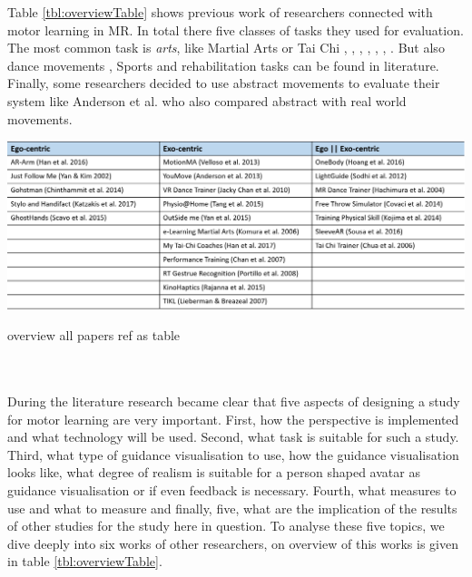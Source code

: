 Table \ref{tbl:overviewTable} shows previous work of researchers connected with motor learning in MR. In total there five classes of tasks they used for evaluation. The most common task is \textit{arts}, like Martial Arts or Tai Chi \cite{Han2016}, \cite{Yan2002}, \cite{Katzakis2017}, \cite{Han2017}, \cite{Portillo2008}, \cite{Hoang2016}, \cite{Chua2003} \cite{Komura2006}. But also dance movements \cite{Anderson2013a}\cite{Yan2015}\cite{Chan2007}\cite{Hachimura2004}, Sports \cite{Covaci2014}\cite{Kojima2014} and rehabilitation tasks \cite{Velloso2013}\cite{Chinthammit2014}\cite{Tang2015}\cite{Rajanna2015}\cite{Sousa2016} can be found in literature. Finally, some researchers decided to use abstract movements \cite{Sodhi2012}\cite{Lieberman2007} to evaluate their system like Anderson et al. \cite{Anderson2013a} who also compared abstract with real world movements.
\begin{table}
	\centering
	\includegraphics[width=1.0\textwidth]{img/overview_table.png}
	\caption{overview all papers \todo ref as table}
	\label{tbl:overviewTable}
\end{table}\\ $ $\\
During the literature research became clear that five aspects of designing a study for motor learning are very important. First, how the perspective is implemented and what technology will be used. Second, what task is suitable for such a study. Third, what type of guidance visualisation to use, how the guidance visualisation looks like, what degree of realism is suitable for a person shaped avatar as guidance visualisation or if even feedback is necessary. Fourth, what measures to use and what to measure and finally, five, what are the implication of the results of other studies for the study here in question. To analyse these five topics, we dive deeply into six works of other researchers, on overview of this works is given in table \ref{tbl:overviewTable}.
